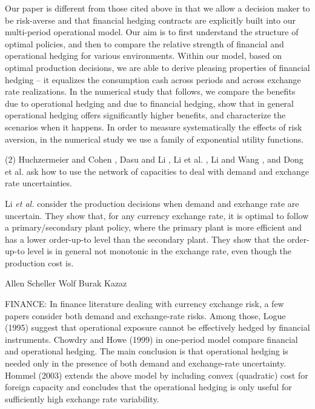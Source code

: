 \documentclass[mnsc,nonblindrev,copyedit]{informs2_wz} %
\begin{document}
Our paper is different from those cited above in that we allow a decision maker to be risk-averse and that financial hedging contracts are explicitly built into our multi-period operational model.  Our aim is to first understand the structure of optimal policies, and then to compare the relative strength of financial and operational hedging for various environments.  Within our model, based on optimal production decisions, we are able to derive pleasing properties of financial hedging -- it equalizes the consumption cash across periods and across exchange rate realizations. In the numerical study that follows, we compare the benefits due to operational hedging and due to financial hedging, show that in general operational hedging offers significantly higher benefits, and characterize the scenarios when it happens.  In order to measure systematically the effects of risk aversion, in the numerical study we use a family of exponential utility functions.


(2) Huchzermeier and Cohen \cite{Huchzermeier}, Dasu and Li \cite{Dasu}, Li et al.  \cite{Li2001}, Li and Wang \cite{li_outsourcing_2010}, and Dong et al. \cite{dong_global_2010} ask how to use the network of capacities to deal with demand and exchange rate uncertainties.  


Li {\it et al.} \cite{Li2001} consider the production decisions when demand and exchange rate are uncertain.  They show that, for any currency exchange rate, it is optimal to follow a primary/secondary plant policy, where the primary plant is more efficient and has a lower order-up-to level than the secondary plant.  They show that the order-up-to level is in general not monotonic in the exchange rate, even though the production cost is.  

Allen Scheller Wolf 
Burak Kazaz


FINANCE:
In finance literature dealing with currency exchange risk, a few papers consider both demand and exchange-rate risks.  
Among those, Logue (1995) suggest that operational exposure cannot be effectively hedged by financial instruments. 
Chowdry and Howe (1999) in one-period model compare financial and operational hedging.  The main conclusion is that operational hedging is needed only in the presence of both demand and exchange-rate uncertainty.
Hommel (2003) extends the above model by including convex (quadratic) cost for foreign capacity and concludes that the operational hedging is only useful for sufficiently high exchange rate variability.
\end{document}
